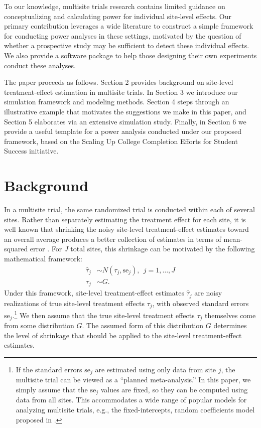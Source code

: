 \documentclass[]{article}
\begin{document}
To our knowledge, multisite trials research contains limited guidance on conceptualizing and calculating power for individual site-level effects.
Our primary contribution leverages a wide literature to construct a simple framework for conducting power analyses in these settings, motivated by the question of whether a prospective study may be sufficient to detect these individual effects.
We also provide a software package to help those designing their own experiments conduct these analyses.

The paper proceeds as follows.
Section 2 provides background on site-level treatment-effect estimation in multisite trials.
In Section 3 we introduce our simulation framework and modeling methods.
Section 4 steps through an illustrative example that motivates the suggestions we make in this paper, and Section 5 elaborates via an extensive simulation study.
Finally, in Section 6 we provide a useful template for a power analysis conducted under our proposed framework, based on the Scaling Up College Completion Efforts for Student Success initiative.


\section{Background}

In a multisite trial, the same randomized trial is conducted within each of several sites.
Rather than separately estimating the treatment effect for each site, it is well known that shrinking the noisy site-level treatment-effect estimates toward an overall average produces a better collection of estimates in terms of mean-squared error \citep{james1961estimation}.
For $J$ total sites, this shrinkage can be motivated by the following mathematical framework:
\begin{align*}
    \hat{\tau}_j &\sim N(\tau_j, \text{se}_j), \ \ j=1,\dots,J \\
    \tau_j &\sim G.
\end{align*}
Under this framework, site-level treatment-effect estimates $\hat{\tau}_j$ are noisy realizations of true site-level treatment effects $\tau_j$, with observed standard errors $\text{se}_j$.\footnote{If the standard errors $\text{se}_j$ are estimated using only data from site $j$, the multisite trial can be viewed as a ``planned meta-analysis.''
In this paper, we simply assume that the $\text{se}_j$ values are fixed, so they can be computed using data from all sites.
This accommodates a wide range of popular models for analyzing multisite trials, e.g., the fixed-intercepts, random coefficients model proposed in \cite{bloom2017using}.}
We then assume that the true site-level treatment effects $\tau_j$ themselves come from some distribution $G$.
The assumed form of this distribution $G$ determines the level of shrinkage that should be applied to the site-level treatment-effect estimates.
\end{document}
